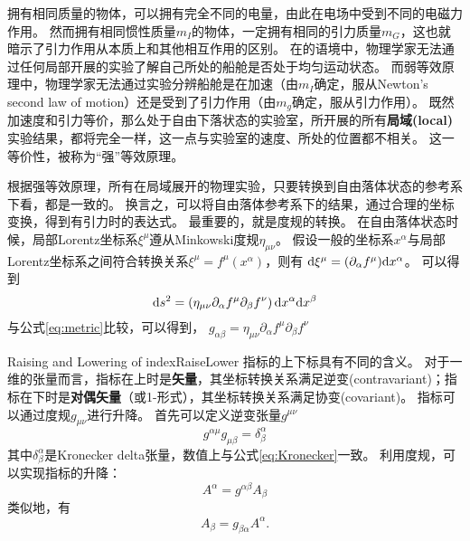 拥有相同质量的物体，可以拥有完全不同的电量，由此在电场中受到不同的电磁力作用。
然而拥有相同惯性质量$m_I$的物体，一定拥有相同的引力质量$m_G$，这也就暗示了引力作用从本质上和其他相互作用的区别。
在\SR 的语境中，物理学家无法通过任何局部开展的实验了解自己所处的船舱是否处于均匀运动状态。
而弱等效原理中，物理学家无法通过实验分辨船舱是在加速（由$m_I$确定，服从Newton's second law of motion）还是受到了引力作用（由$m_g$确定，服从引力作用）。 既然加速度和引力等价，那么处于自由下落状态的实验室，所开展的所有{\textbf{局域(local)}}实验结果，都将完全一样，这一点与实验室的速度、所处的位置都不相关。
这一等价性，被称为“强”等效原理。\cite{Schutz:FirstCourse}

根据强等效原理，所有在局域展开的物理实验，只要转换到自由落体状态的参考系下看，都是一致的。
换言之，可以将自由落体参考系下的结果，通过合理的坐标变换，得到有引力时的表达式。
最重要的，就是度规的转换。
在自由落体状态时候，局部Lorentz坐标系$\xi^\mu$遵从Minkowski度规$\eta_{\mu\nu}$。
假设一般的坐标系$x^\alpha$与局部Lorentz坐标系之间符合转换关系$\xi ^\mu= f^\mu (x^\alpha)$，则有 ${\rm d} \xi ^\mu = (\partial_\alpha f^\mu) {\rm d}x^\alpha$。
可以得到 
\begin{equation}\label{eq:STinterval_diff_GR} 
  {\rm d}s^2 = \left( \eta_ {\mu \nu} \partial_\alpha f^\mu \partial_\beta f^\nu\right){\rm d} x^\alpha {\rm d} x^\beta
\end{equation}
与公式\ref{eq:metric}比较，可以得到，
$g_{\alpha\beta} = \eta_ {\mu \nu} \partial_\alpha f^\mu \partial_\beta f^\nu$

\begin{myprop}{Raising and Lowering of index}{RaiseLower}
  指标的上下标具有不同的含义。
  对于一维的张量而言，指标在上时是{\textbf{矢量}}，其坐标转换关系满足逆变(contravariant)；指标在下时是{\textbf{对偶矢量}}（或1-形式），其坐标转换关系满足协变(covariant)。
  指标可以通过度规$g_{\mu\nu}$进行升降。
  首先可以定义逆变张量$g^{\mu\nu}$
\begin{equation}\label{eq:RaiseLower} 
  g^{\alpha\mu} g_{\mu\beta}=  \delta^{\alpha}_{\beta}
\end{equation}
  其中$\delta^{\alpha}_{\beta}$是Kronecker delta张量，数值上与公式\ref{eq:Kronecker}一致。
  利用度规，可以实现指标的升降：
\begin{equation}\label{eq:Raise} 
  A^\alpha = g^{\alpha\beta} A_{\beta}  
\end{equation}
类似地，有
\begin{equation}\label{eq:Lower} 
  A_{\beta}= g_{\beta\alpha}  A^\alpha .
\end{equation}

\end{myprop}


